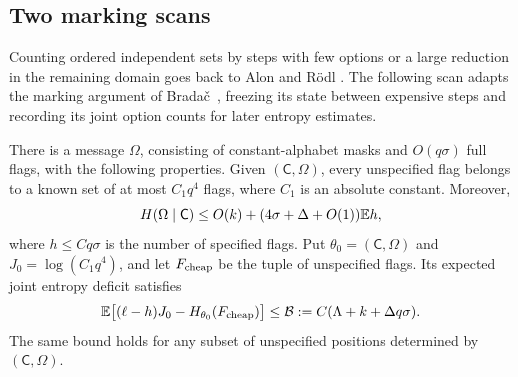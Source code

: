 \subsection{Two marking scans}

Counting ordered independent sets by steps with few options or a large
reduction in the remaining domain goes back to Alon and R\"odl
\cite[Theorem~2.1 and Lemma~2.2]{AlonRodl2005}.
The following scan adapts the marking argument of
Brada\v c~\cite[Claim~2.13]{Bradac2026}, freezing its state between
expensive steps and recording its joint option counts for later entropy estimates.

\begin{lemma}[Marking]\label{lem:marking}
There is a message $\Omega$, consisting of constant-alphabet masks and
$O(q\sigma)$ full flags, with the following properties.
Given $(\mathsf C,\Omega)$, every unspecified flag belongs to a known set
of at most $C_1q^4$ flags, where $C_1$ is an absolute constant.  Moreover,
\begin{equation}\label{eq:marking-cost}
 H(\Omega\mid\mathsf C)
 \le O(k)+(4\sigma+\Delta+O(1))\mathbb E h,
\end{equation}
where $h\le Cq\sigma$ is the number of specified flags.
Put $\theta_0=(\mathsf C,\Omega)$ and $J_0=\log(C_1q^4)$, and let
$F_{\rm cheap}$ be the tuple of unspecified flags. Its expected joint
entropy deficit satisfies
\begin{equation}\label{eq:deficit-budget}
 \mathbb E\bigl[(\ell-h)J_0-H_{\theta_0}(F_{\rm cheap})\bigr]
 \le \mathcal B:=C(\Lambda+k+\Delta q\sigma).
\end{equation}
The same bound holds for any subset of unspecified positions determined
by $(\mathsf C,\Omega)$.
\end{lemma}

